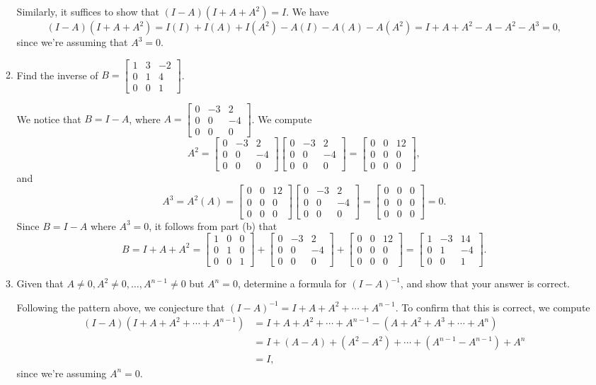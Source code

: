 \documentclass[letterpaper,12pt]{article}
\newcommand{\bbm}{\begin{bmatrix}}
\newcommand{\ebm}{\end{bmatrix}}
\begin{document}
\begin{enumerate}
\begin{enumerate}
\medskip

Similarly, it suffices to show that $(I-A)(I+A+A^2) = I$. We have
\[
 (I-A)(I+A+A^2) = I(I)+I(A)+I(A^2)-A(I)-A(A)-A(A^2) = I+A+A^2-A-A^2-A^3 = 0,
\]
since we're assuming that $A^3=0$.

\medskip

 \item Find the inverse of $B = \bbm 1&3&-2\\0&1&4\\0&0&1\ebm$.

\medskip

We notice that $B = I-A$, where $A =\bbm 0&-3&2\\0&0&-4\\0&0&0\ebm$. We compute 
\[
 A^2 = \bbm 0&-3&2\\0&0&-4\\0&0&0\ebm\bbm 0&-3&2\\0&0&-4\\0&0&0\ebm = \bbm 0&0&12\\0&0&0\\0&0&0\ebm,
\]
and 
\[
 A^3 = A^2(A) = \bbm 0&0&12\\0&0&0\\0&0&0\ebm\bbm 0&-3&2\\0&0&-4\\0&0&0\ebm=\bbm 0&0&0\\0&0&0\\0&0&0\ebm = 0.
\]
Since $B=I-A$ where $A^3=0$, it follows from part (b) that
\[
 B = I+A+A^2 = \bbm 1&0&0\\0&1&0\\0&0&1\ebm + \bbm 0&-3&2\\0&0&-4\\0&0&0\ebm + \bbm 0&0&12\\0&0&0\\0&0&0\ebm = \bbm 1&-3&14\\0&1&-4\\0&0&1\ebm.
\]

 \item Given that $A\neq 0, A^2\neq 0, \ldots, A^{n-1}\neq 0$ but $A^n=0$, determine a formula for $(I-A)^{-1}$, and show that your answer is correct.

\bigskip

Following the pattern above, we conjecture that $(I-A)^{-1} = I+A+A^2+\cdots + A^{n-1}$. To confirm that this is correct, we compute
\begin{align*}
 (I-A)(I+A+A^2+\cdots +A^{n-1}) &= I+A+A^2+\cdots + A^{n-1} - (A+A^2+A^3+\cdots +A^n)\\& = I+(A-A)+(A^2-A^2)+\cdots+(A^{n-1}-A^{n-1}) + A^n\\& = I,
\end{align*}
since we're assuming $A^n = 0$.
\end{enumerate}


\end{enumerate}
\end{document}
